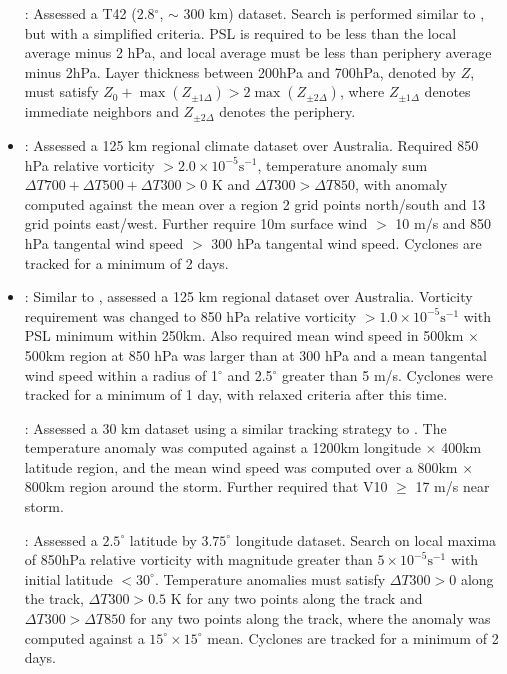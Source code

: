 \documentclass[gmdd, hvmath, online]{copernicus_discussions}
\begin{document}
\begin{itemize}
\cite{tsutsui2002implications}:  Assessed a T42 (2.8$^\circ$, $\sim$ 300 km) dataset.  Search is performed similar to \cite{tsutsui1996simulated}, but with a simplified criteria.  PSL is required to be less than the local average minus 2 hPa, and local average must be less than periphery average minus 2hPa.  Layer thickness between 200hPa and 700hPa, denoted by $Z$, must satisfy $Z_0 + \max(Z_{\pm 1 \Delta}) > 2 \max(Z_{\pm 2 \Delta})$, where $Z_{\pm 1 \Delta}$ denotes immediate neighbors and $Z_{\pm 2 \Delta}$ denotes the periphery.

\item \cite{walsh1997objective, walsh1997tropical, walsh2000impact}:  Assessed a 125 km regional climate dataset over Australia.  Required 850 hPa relative vorticity $> 2.0 \times 10^{-5} \mbox{s}^{-1}$, temperature anomaly sum $\Delta T700+ \Delta T500+ \Delta T300 > 0$ K and $\Delta T300 > \Delta T850$, with anomaly computed against the mean over a region 2 grid points north/south and 13 grid points east/west.  Further require 10m surface wind $>$ 10 m/s and 850 hPa tangental wind speed $>$ 300 hPa tangental wind speed.  Cyclones are tracked for a minimum of 2 days.

\item \cite{nguyen2001interannual}:  Similar to \cite{walsh1997tropical}, assessed a 125 km regional dataset over Australia.  Vorticity requirement was changed to 850 hPa relative vorticity $> 1.0 \times 10^{-5} \mbox{s}^{-1}$ with PSL minimum within 250km.  Also required mean wind speed in 500km $\times$ 500km region at 850 hPa was larger than at 300 hPa and a mean tangental wind speed within a radius of 1$^\circ$ and 2.5$^\circ$ greater than 5 m/s.  Cyclones were tracked for a minimum of 1 day, with relaxed criteria after this time.

\cite{walsh2004fine}:  Assessed a 30 km dataset using a similar tracking strategy to \cite{nguyen2001interannual}.  The temperature anomaly was computed against a 1200km longitude $\times$ 400km latitude region, and the mean wind speed was computed over a 800km $\times$ 800km region around the storm.  Further required that V10 $\geq$ 17 m/s near storm.

\cite{mcdonald2005tropical}:  Assessed a $2.5^\circ$ latitude by $3.75^\circ$ longitude dataset.  Search on local maxima of 850hPa relative vorticity with magnitude greater than $5 \times 10^{-5} \mbox{s}^{-1}$ with initial latitude $< 30^\circ$.  Temperature anomalies must satisfy $\Delta T300 > 0$ along the track, $\Delta T300 > 0.5$ K for any two points along the track and $\Delta T300 > \Delta T850$ for any two points along the track, where the anomaly was computed against a $15^\circ \times 15^\circ$ mean.  Cyclones are tracked for a minimum of 2 days.

\end{itemize}
\end{document}
